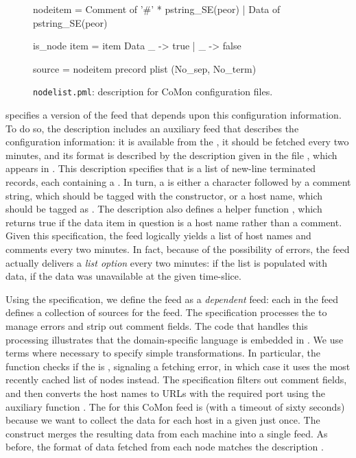 \begin{figure}[t]
\begin{code}
 nodeitem =
  Comment of '#' * pstring_SE(peor)
| Data of pstring_SE(peor)

 is_node item = 
   item 
  Data _ -> true
  | _ -> false

 source = 
  nodeitem precord plist (No_sep, No_term)
\end{code}
\shrink
\shrink
\caption{\texttt{nodelist.pml}: \padsml{} description for CoMon configuration 
  files.}\shrink
\label{fig:nodepml}
\end{figure}


 specifies a version of the  feed that
depends upon this configuration information.  To do so, the
description includes an auxiliary feed  that describes the
configuration information: it is available from the
, it should be fetched every two minutes, and its
format is described by the \padsml{} description  given in
the file , which appears in .
This \padsml{} description specifies that  is a list of
new-line terminated records, each containing a .  In
turn, a  is either a  character followed by a
comment string, which should be tagged with the 
constructor, or a host name, which should be tagged as
. The description also defines a helper function ,
which returns true if the data item in question is a host name
rather than a comment.  Given this specification, the  feed
logically yields a list of host names and comments every two minutes.
In fact, because of the possibility of errors, the feed actually
delivers a {\em list option} every two minutes:  if the list is
populated with data,  if the data was unavailable at the
given time-slice.

Using the  specification, we define the  feed as a
\textit{dependent} feed: each  in the  feed defines a
collection of sources for the  feed.  The  
specification processes the  to manage errors and strip
out comment fields.  The code that handles this processing illustrates
that the \padsd{} domain-specific language is embedded in \ocaml{}.
We use \ocaml{} terms where necessary to specify simple
transformations.  In particular, the  function checks if
the  is , signaling a fetching error, in which
case it uses the most recently cached list of nodes instead.  The
 specification filters out comment fields, and then
converts the host names to URLs with the required port using the
auxiliary function .  The  for this CoMon
feed is  (with a timeout of sixty seconds) because we want to
collect the data for each host in a given  just once.
The  construct merges the resulting data from
each machine into a single feed.  As
before, the format of data fetched from each node matches the
description .  

